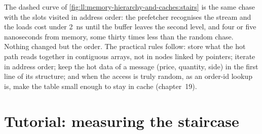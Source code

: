 The dashed curve of \cref{fig:ll:memory-hierarchy-and-caches:stairs} is the same chase with the slots visited in address
order: the prefetcher recognises the stream and the loads cost under \qty{2}{\nano\second} until the buffer leaves the
second level, and four or five nanoseconds from memory, some thirty times less than the random chase. Nothing changed but
the order. The practical rules follow: store what the hot path reads together in contiguous arrays, not in nodes linked
by pointers; iterate in address order; keep the hot data of a message (price, quantity, side) in the first line of its
structure; and when the access is truly random, as an order-id lookup is, make the table small enough to stay in cache
(chapter~19).

\section{Tutorial: measuring the staircase}\label{tut:ll:memory-hierarchy-and-caches:tut}

